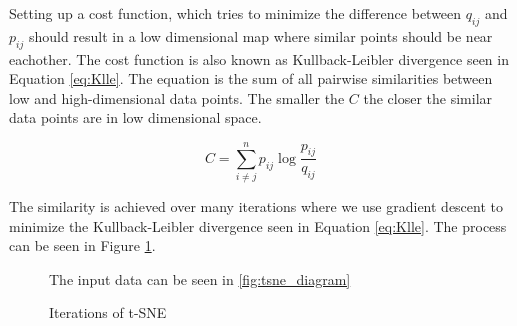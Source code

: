Setting up a cost function, which tries to minimize the difference between $q_{ij}$ and $p_{ij}$ should result in a low dimensional map where similar points should be near eachother.
The cost function is also known as Kullback-Leibler divergence seen in Equation \ref{eq:Klle}. 
The equation is the sum of all pairwise similarities between low and high-dimensional data points.
The smaller the $C$ the closer the similar data points are in low dimensional space.

\begin{equation}
\label{eq:Klle}
 C = \sum_{i \neq j}^n p_{ij} \log \frac{p_{ij}}{q_{ij}}
\end{equation}

The similarity is achieved over many iterations where we use gradient descent to minimize the Kullback-Leibler divergence seen in Equation \ref{eq:Klle}. 
The process can be seen in Figure \ref{fig:tsne_iterations_arrows}.

\begin{figure}[H]
    \centering
    \caption{Iterations of t-SNE}
	\par
    \par\footnotesize{The input data can be seen in \ref{fig:tsne_diagram} }
	\label{fig:tsne_iterations_arrows}
\end{figure}


